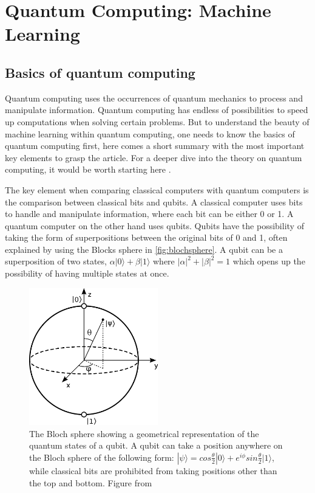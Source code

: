 \documentclass[../main.tex]{subfiles}
\begin{document}
\chapter{Quantum Computing: Machine Learning}
\label{sec:fifth}

\section{Basics of quantum computing}\label{sec:basic_qc}
Quantum computing uses the occurrences of quantum mechanics to process and manipulate information. Quantum computing has endless of possibilities to speed up computations when solving certain problems.
But to understand the beauty of machine learning within quantum computing, one needs to know the basics of quantum computing first, here comes a short summary with the most important key elements to grasp the article. For a deeper dive into the theory on quantum computing, it would be worth starting here \cite{10.5555/1972505}.

The key element when comparing classical computers with quantum computers is the comparison between classical bits and qubits. A classical computer uses bits to handle and manipulate information, where each bit can be either 0 or 1. A quantum computer on the other hand uses qubits. Qubits have the possibility of taking the form of superpositions between the original bits of 0 and 1, often explained by using the Blocks sphere in \autoref{fig:blochsphere}. A qubit can be a superposition of two states, \ensuremath{\alpha|0\rangle+\beta|1\rangle} where \ensuremath{|\alpha|^2+|\beta|^2=1} which opens up the possibility of having multiple states at once.

\begin{figure}[h]
    \centering
    \includegraphics[width=0.5\textwidth]{figures/blochsphere.png}
    \caption{The Bloch sphere showing a geometrical representation of the quantum states of a qubit. A qubit can take a position anywhere on the Bloch sphere of the following form: \ensuremath{|\psi\rangle=cos\frac{\theta}{2}|0\rangle+e^{i\phi}sin\frac{\theta}{2}|1\rangle}, while classical bits are prohibited from taking positions other than the top and bottom. Figure from \cite{blochsphere_fig}}
    \label{fig:blochsphere}
\end{figure}
\end{document}
